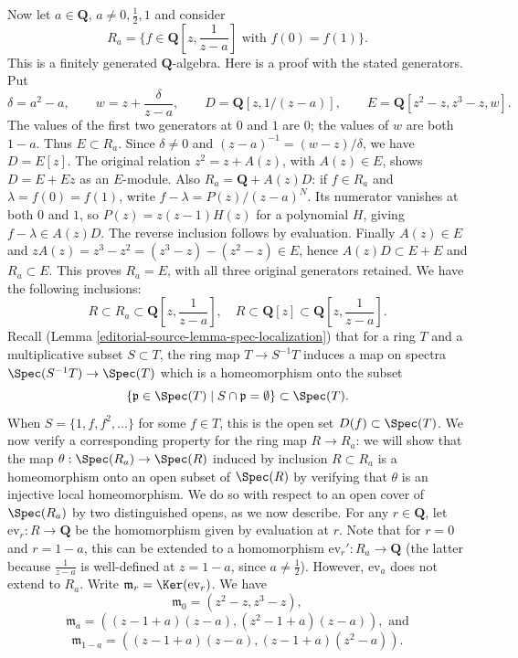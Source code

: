 \begin{example}
\medskip\noindent
Now let $a \in \mathbf{Q}$, $a \neq 0, \frac{1}{2}, 1$ and
consider
$$
R_a = \{ f \in \mathbf{Q}[z, \frac{1}{z-a}]\text{ with }f(0) = f(1)
\}.
$$
This is a finitely generated $\mathbf Q$-algebra. Here is a proof
with the stated generators. Put
$$
\delta=a^2-a,\qquad
w=z+\frac{\delta}{z-a},\qquad
D=\mathbf Q[z,1/(z-a)],\qquad
E=\mathbf Q[z^2-z,z^3-z,w].
$$
The values of the first two generators at $0$ and $1$ are $0$;
the values of $w$ are both $1-a$. Thus $E\subset R_a$.
Since $\delta\ne0$ and $(z-a)^{-1}=(w-z)/\delta$, we have
$D=E[z]$. The original relation $z^2=z+A(z)$, with $A(z)\in E$,
shows $D=E+Ez$ as an $E$-module.
Also $R_a=\mathbf Q+A(z)D$: if $f\in R_a$ and
$\lambda=f(0)=f(1)$, write $f-\lambda=P(z)/(z-a)^N$.
Its numerator vanishes at both $0$ and $1$, so $P(z)=z(z-1)H(z)$
for a polynomial $H$, giving $f-\lambda\in A(z)D$.
The reverse inclusion follows by evaluation.
Finally $A(z)\in E$ and
$zA(z)=z^3-z^2=(z^3-z)-(z^2-z)\in E$, hence
$A(z)D\subset E+E$ and $R_a\subset E$.
This proves $R_a=E$, with all three original generators retained.
We have the following inclusions:
$$
R\subset R_a\subset\mathbf{Q}[z, \frac{1}{z-a}], \quad
R\subset\mathbf{Q}[z]\subset\mathbf{Q}[z, \frac{1}{z-a}].
$$
Recall (Lemma \ref{editorial-source-lemma-spec-localization}) that for a ring $T$ and a
multiplicative subset $S\subset T$, the ring map $T \to S^{-1}T$
induces a map on spectra $\Spec(S^{-1}T) \to \Spec(T)$
which is a homeomorphism onto the subset
$$
\{\mathfrak p \in \Spec(T) \mid S \cap \mathfrak p = \emptyset\}
\subset \Spec(T).
$$
When $S = \{ 1, f, f^2, \ldots\}$ for some $f\in T$, this is
the open set $D(f)\subset \Spec(T)$.  We now verify a corresponding
property for the ring map $R \to R_a$: we will show that the map
$\theta : \Spec(R_a) \to \Spec(R)$ induced by inclusion
$R\subset R_a$ is a homeomorphism onto an open subset of
$\Spec(R)$ by verifying that $\theta$ is an injective local
homeomorphism.  We do so with respect to an open cover of
$\Spec(R_a)$ by two distinguished opens, as we now describe.
For any $r\in\mathbf{Q}$, let $\text{ev}_r : R \to \mathbf{Q}$ be the
homomorphism given by evaluation at $r$.  Note that for $r = 0$ and
$r = 1-a$, this can be extended to a homomorphism
$\text{ev}_r' : R_a \to \mathbf{Q}$ (the latter because $\frac{1}{z-a}$
is well-defined at $z = 1-a$, since $a\neq\frac{1}{2}$).  However,
$\text{ev}_a$ does not extend to $R_a$.  Write
$\mathfrak{m}_r = \Ker(\text{ev}_r)$. We have
$$
\mathfrak{m}_0 = (z^2-z, z^3-z),
$$
$$
\mathfrak{m}_a = ((z-1 + a)(z-a), (z^2-1 + a)(z-a)), \text{ and}
$$
$$
\mathfrak{m}_{1-a} = ((z-1 + a)(z-a), (z-1 + a)(z^2-a)).
$$
\end{example}
